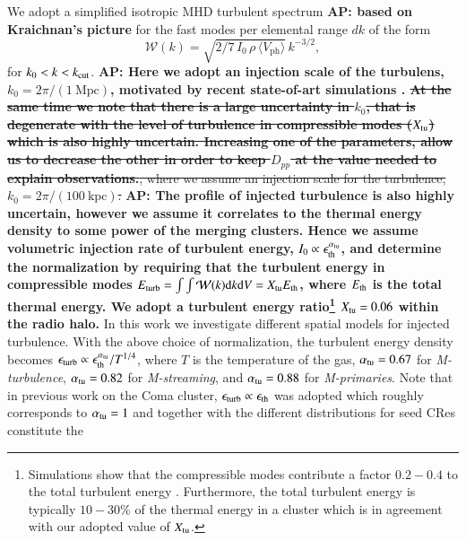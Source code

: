 \documentclass[useAMS,usenatbib]{mn2e}
\newcommand{\Mstream}{{\it M-streaming}\xspace}
\newcommand{\Mflatturb}{{\it M-turbulence}\xspace}
\newcommand{\Mprimary}{{\it M-primaries}\xspace}
\newcommand{\Vph}{V_\mathrm{ph}}
\def\AP#1{{\bf  AP: #1}}
\begin{document}
We adopt a simplified isotropic MHD turbulent spectrum \AP{based on
Kraichnan's picture} for the fast modes per elemental range $dk$ of
  the form
\begin{equation}
  \label{eq:Wk}
  \mathcal{W}(k) =
\sqrt{2/7\,I_0\,\rho\,\langle \Vph \rangle}\,k^{-3/2},
\end{equation}
for $k_0<k<k_{\mathrm{cut}}$. \AP{Here we adopt an injection scale of the
  turbulens, $k_0= 2\pi/(1~\mbox{Mpc})$, motivated by recent
  state-of-art simulations
  \citep{2009A&A...504...33V,2011A&A...529A..17V,2015ApJ...800...60M}. \sout{At
    the same time we note that there is a large uncertainty in $k_0$,
    that is degenerate with the level of turbulence in compressible
    modes ($X_{\mathrm{tu}}$) which is also highly uncertain. Increasing
    one of the parameters, allow us to decrease the other in order to
    keep $D_{pp}$ at the value needed to explain
    observations.}}\sout{, where we assume an injection scale for the
  turbulence, $k_0= 2\pi/(100~\mbox{kpc})$.} \AP{The profile of
  injected turbulence is also highly uncertain, however we assume it
  correlates to the thermal energy density to some power of the
  merging clusters. Hence we assume volumetric injection rate of
  turbulent energy, $I_0\propto \epsilon_{\mathrm{th}}^{\alpha_{\mathrm{tu}}}$,
  and determine the normalization by requiring that the turbulent
  energy in compressible modes $E_{\mathrm{turb}}=\int \int \mathcal{W}(k)
  {\mathrm{d}}k {\mathrm{d}}V = X_{\mathrm{tu}} E_{\mathrm{th}}$, where $E_{\mathrm{th}}$ is
  the total thermal energy. We adopt a turbulent energy
  ratio\footnote{Simulations show that the compressible modes
    contribute a factor $0.2-0.4$ to the total turbulent energy
    \citep{2013ApJ...771..131B,2015ApJ...800...60M}. Furthermore, the
    total turbulent energy is typically $10-30$\% of the thermal
    energy in a cluster which is in agreement with our adopted value
    of $X_{\mathrm{tu}}$.}  $X_{\mathrm{tu}}=0.06$ within the radio halo.} In
this work we investigate different spatial models for injected
turbulence. With the above choice of normalization, the turbulent
energy density becomes $\epsilon_{\mathrm{turb}} \propto
\epsilon_{\mathrm{th}}^{\alpha_{\mathrm{tu}}}/T^{1/4}$, where $T$ is the
temperature of the gas, $\alpha_{\mathrm{tu}}= 0.67$ for \Mflatturb,
$\alpha_{\mathrm{tu}}= 0.82$ for \Mstream, and $\alpha_{\mathrm{tu}}= 0.88$ for
\Mprimary. Note that in previous work on the Coma cluster,
$\epsilon_{\mathrm{turb}} \propto \epsilon_{\mathrm{th}}$ was adopted which
roughly corresponds to $\alpha_{\mathrm{tu}}= 1$ \citep{brunetti12} and
together with the different distributions for seed CRes constitute the
\end{document}
